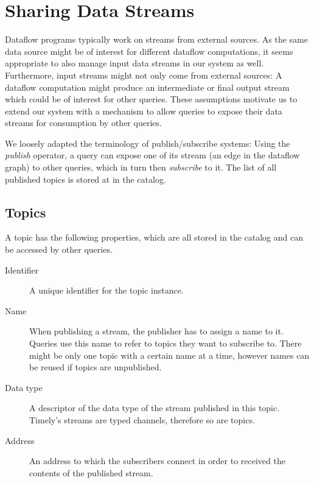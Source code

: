 \section{Sharing Data Streams} \label{sec:sharingstreams}

Dataflow programs typically work on streams from external sources. As the same
data source might be of interest for different dataflow computations, it seems
appropriate to also manage input data streams in our system as well. Furthermore,
input streams might not only come from external sources: A dataflow computation
might produce an intermediate or final output stream which could be of interest
for other queries. These assumptions motivate us to extend our system with a
mechanism to allow queries to expose their data streams for consumption by other
queries.


We loosely adapted the terminology of publish/subscribe systems: Using the
\emph{publish} operator, a query can expose one of its stream
(an edge in the dataflow graph) to other queries, which in turn then \emph{subscribe}
to it. The list of all published topics is stored at in the catalog.

\subsection{Topics}

A topic has the following properties, which are all stored in the catalog
and can be accessed by other queries.
\begin{description}
\item [Identifier] A unique identifier for the topic instance.
\item [Name] When publishing a stream, the publisher has to assign a name to it.
Queries use this name to refer to topics they want to subscribe to. There might
be only one topic with a certain name at a time, however names can be reused if
topics are unpublished.
\item [Data type] A descriptor of the data type of the stream published in this
topic. Timely's streams are typed channels, therefore so are topics.
\item [Address] An address to which the subscribers connect in order to received
the contents of the published stream.
\end{description}

